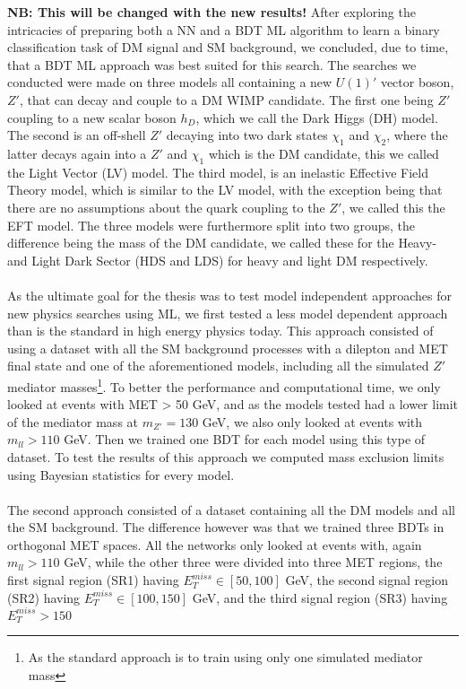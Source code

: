\documentclass[12pt, a4paper]{book}
\begin{document}
\textbf{NB: This will be changed with the new results!}
After exploring the intricacies of preparing both a NN and a BDT ML algorithm to learn a binary classification task of DM signal and SM background, we concluded, due to time, that a BDT ML approach was 
best suited for this search. The searches we conducted were made on three models all containing a new $U(1)'$ vector boson, $Z'$, that can decay and couple to a DM WIMP candidate. The first one being $Z'$ coupling to a new scalar boson $h_D$, 
which we call the Dark Higgs (DH) model. The second is an off-shell $Z'$ decaying into two dark states $\chi_1$ and $\chi_2$, where the latter decays again into a $Z'$ and $\chi_1$ which is the DM candidate, this we called the Light Vector (LV) model. 
The third model, is an inelastic Effective Field Theory model, which is similar to the LV model, with the exception being that there are no assumptions about the quark coupling to the $Z'$, we called this the EFT model. The three models were furthermore 
split into two groups, the difference being the mass of the DM candidate, we called these for the Heavy- and Light Dark Sector (HDS and LDS) for heavy and light DM respectively.\\
\\As the ultimate goal for the thesis was to test model independent approaches for new physics searches using ML, we first tested a less model dependent approach than is the standard in high energy physics today. This approach consisted of using a dataset 
with all the SM background processes with a dilepton and MET final state and one of the aforementioned models, including all the simulated $Z'$ mediator masses\footnote{As the standard approach is to train using only one simulated mediator mass}. 
To better the performance and computational time, we only looked at events with MET > 50 GeV, and as the models tested had a lower limit of the mediator mass at $m_{Z'}=130$ GeV, we also only looked at events with $m_{ll}>110$ GeV. Then we trained one BDT 
for each model using this type of dataset. To test the results of this approach we computed mass exclusion limits using Bayesian statistics for every model.\\
\\The second approach consisted of a dataset containing all the DM models and all the SM background. The difference however was that we trained three BDTs in orthogonal MET spaces. All the networks only looked at events with, again $m_{ll}>110$ 
GeV, while the other three were divided into three MET regions, the first signal region (SR1) having $E_T^{miss}\in[50,100]$ GeV, the second signal region (SR2) having $E_T^{miss}\in[100,150]$ GeV, and the third signal region (SR3) having $E_T^{miss}>150$ 
\end{document}
